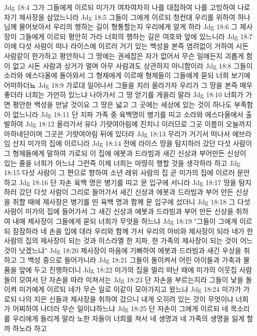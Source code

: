 Jdg 18:4  그가 그들에게 이르되 미가가 여차여차히 나를 대접하여 나를 고빙하여 나로 자기 제사장을 삼았느니라
Jdg 18:5  그들이 그에게 이르되 청컨대 우리를 위하여 하나님께 물어보아서 우리의 행하는 길이 형통할는지 우리에게 알게 하라
Jdg 18:6  그 제사장이 그들에게 이르되 평안히 가라 너희의 행하는 길은 여호와 앞에 있느니라
Jdg 18:7  이에 다섯 사람이 떠나 라이스에 이르러 거기 있는 백성을 본즉 염려없이 거하여 시돈 사람같이 한가하고 평안하니 그 땅에는 권세잡은 자가 없어서 무슨 일에든지 괴롭게 함이 없고 시돈 사람과 상거가 멀며 아무 사람과도 상관하지 아니함이라
Jdg 18:8  그들이 소라와 에스다올에 돌아와서 그 형제에게 이르매 형제들이 그들에게 묻되 너희 보기에 어떠하더뇨
Jdg 18:9  가로대 일어나서 그들을 치러 올라가자 우리가 그 땅을 본즉 매우 좋더라 너희는 가만히 있느냐 나아가서 그 땅 얻기를 게을리 말라
Jdg 18:10  너희가 가면 평안한 백성을 만날 것이요 그 땅은 넓고 그 곳에는 세상에 있는 것이 하나도 부족함이 없느니라
Jdg 18:11  단 지파 가족 중 육백명이 병기를 띠고 소라와 에스다올에서 출발하여
Jdg 18:12  올라가서 유다 기럇여아림에 진치니 이러므로 그곳 이름이 오늘까지 마하네단이며 그곳은 기럇여아림 뒤에 있더라
Jdg 18:13  무리가 거기서 떠나서 에브라임 산지 미가의 집에 이르니라
Jdg 18:14  전에 라이스 땅을 탐지하러 갔던 다섯 사람이 그 형제들에게 말하여 가로되 이 집에 에봇과 드라빔과 새긴 신상과 부어만든 신상이 있는 줄을 너희가 아느냐 그런즉 이제 너희는 마땅히 행할 것을 생각하라 하고
Jdg 18:15  다섯 사람이 그 편으로 향하여 소년 레위 사람의 집 곧 미가의 집에 이르러 문안하고
Jdg 18:16  단 자손 육백 명은 병기를 띠고 문 입구에 서니라
Jdg 18:17  땅을 탐지하러 갔던 다섯 사람이 그리로 들어가서 새긴 신상과 에봇과 드라빔과 부어 만든 신상을 취할 때에 제사장은 병기를 띤 육백 명과 함께 문 입구에 섰더니
Jdg 18:18  그 다섯 사람이 미가의 집에 들어가서 그 새긴 신상과 에봇과 드라빔과 부어 만든 신상을 취하여 내매 제사장이 그들에게 묻되 너희가 무엇을 하느냐
Jdg 18:19  "그들이 그에게 이르되 잠잠하라 네 손을 입에 대라 우리와 함께 가서 우리의 아비와 제사장이 되라 네가 한 사람의 집의 제사장이 되는 것과 이스라엘 한 지파, 한 가족의 제사장이 되는 것이 어느 것이 낫겠느냐"
Jdg 18:20  제사장이 마음에 기뻐하여 에봇과 드라빔과 새긴 우상을 취하고 그 백성 중으로 들어가니라
Jdg 18:21  그들이 돌이켜서 어린 아이들과 가축과 물품을 앞에 두고 진행하더니
Jdg 18:22  미가의 집을 멀리 떠난 때에 미가의 이웃집 사람들이 모여서 단 자손을 따라 미쳐서는
Jdg 18:23  단 자손을 부르는지라 그들이 낯을 돌이켜 미가에게 이르되 네가 무슨 일로 이같이 모아가지고 왔느냐
Jdg 18:24  미가가 가로되 나의 지은 신들과 제사장을 취하여 갔으니 내게 오히려 있는 것이 무엇이냐 너희가 어찌하여 나더러 무슨 일이냐하느냐
Jdg 18:25  단 자손이 그에게 이르되 네 목소리를 우리에게 들리게 말라 노한 자들이 너희를 쳐서 네 생명과 네 가족의 생명을 잃게 할까 하노라 하고
